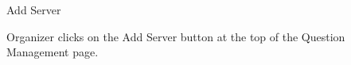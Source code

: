 
\begin{uc}{Add Server}


    \begin{uc-trig}
        Organizer clicks on the Add Server button at the top of the Question Management
        page.
    \end{uc-trig}

\end{uc}

